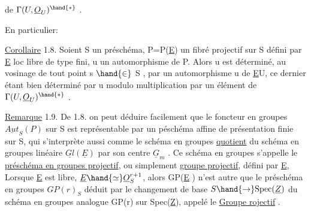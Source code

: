 
de $\Gamma(U,\underline{O}_U)^{\hand{*}}$ .

En particulier:

\uline{Corollaire} 1.8. Soient S un préschéma, P=P(\underline{E}) un fibré projectif sur S
défini par \underline{E} loc libre de type fini, u un automorphisme de P. Alors u
est déterminé, au vosinage de tout point s $\hand{\in}$ S , par un automorphisme
u de \underline{E}\hand{|}U, ce dernier étant bien déterminé par u modulo multiplication par
un élément de $\Gamma(U,\underline{O}_U)^{\hand{*}}$ .

\uline{Remarque} 1.9. De 1.8. on  peut déduire facilement que le foncteur 
 en groupes $\underline{Aut}_S(P)$ sur S est représentable par un péschéma affine
de présentation finie sur S, qui s'interprète aussi comme le schéma en
groupes \uline{quotient} du schéma en groupes linéaire $\underline{Gl}(\underline{E})$ par son centre
$\underline{G}_m$ . Ce schéma en groupes s'appelle 
le \uline{préschéma en groupes projectif}, ou simplement \uline{groupe projectif}, défini
par \underline{E},  Lorsque \underline{E} est libre, $\underline{E}\hand{\simeq}\underline{O}_S^{r+1}$, alors GP(\underline{E} ) n'est autre que le
 préschéma en groupes $GP(r)_S$ déduit par le changement de base
$S\hand{\to}\mathrm{Spec}(\underline{Z})$  du schéma en groupes analogue GP(r) sur Spec(\underline{Z}), appelé
le \uline{Groupe rojectif} .

